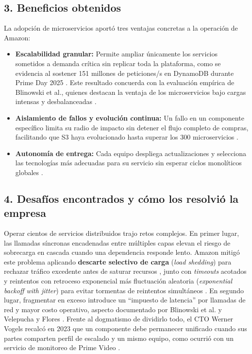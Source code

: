 \documentclass[10pt,letterpaper]{article}
\begin{document}
\subsection*{3. Beneficios obtenidos}
La adopción de microservicios aportó tres ventajas concretas a la operación de Amazon:
\begin{itemize}[leftmargin=*, itemsep=1pt, topsep=2pt]
    \item \textbf{Escalabilidad granular:} Permite ampliar únicamente los servicios sometidos a demanda crítica sin replicar toda la plataforma, como se evidencia al sostener 151 millones de peticiones/s en DynamoDB durante Prime Day 2025 \cite{yun2025primeday}. Este resultado concuerda con la evaluación empírica de Blinowski et al., quienes destacan la ventaja de los microservicios bajo cargas intensas y desbalanceadas \cite{blinowski2022monolithic}.
    \item \textbf{Aislamiento de fallos y evolución continua:} Un fallo en un componente específico limita su radio de impacto sin detener el flujo completo de compras, facilitando que S3 haya evolucionado hasta superar los 300 microservicios \cite{vogels2023monoliths}.
    \item \textbf{Autonomía de entrega:} Cada equipo despliega actualizaciones y selecciona las tecnologías más adecuadas para su servicio sin esperar ciclos monolíticos globales \cite{velepucha2023survey}.
\end{itemize}

\subsection*{4. Desafíos encontrados y cómo los resolvió la empresa}
Operar cientos de servicios distribuidos trajo retos complejos. En primer lugar, las llamadas síncronas encadenadas entre múltiples capas elevan el riesgo de sobrecarga en cascada cuando una dependencia responde lento. Amazon mitigó este problema aplicando \textbf{descarte selectivo de carga} (\emph{load shedding}) para rechazar tráfico excedente antes de saturar recursos \cite{yanacek_loadshedding}, junto con \emph{timeouts} acotados y reintentos con retroceso exponencial más fluctuación aleatoria (\emph{exponential backoff with jitter}) para evitar tormentas de reintentos simultáneos \cite{brooker_timeouts}. En segundo lugar, fragmentar en exceso introduce un ``impuesto de latencia'' por llamadas de red y mayor costo operativo, aspecto documentado por Blinowski et al. \cite{blinowski2022monolithic} y Velepucha y Flores \cite{velepucha2023survey}. Frente al dogmatismo de dividirlo todo, el CTO Werner Vogels recalcó en 2023 que un componente debe permanecer unificado cuando sus partes comparten perfil de escalado y un mismo equipo, como ocurrió con un servicio de monitoreo de Prime Video \cite{vogels2023monoliths}.
\end{document}
